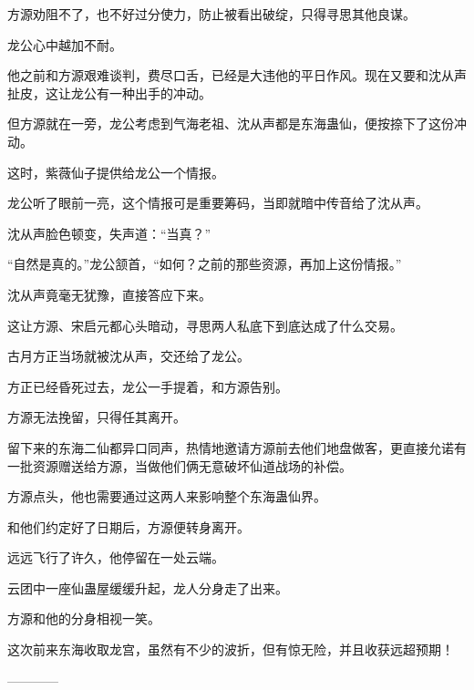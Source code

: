 \begin{this_body}
方源劝阻不了，也不好过分使力，防止被看出破绽，只得寻思其他良谋。

龙公心中越加不耐。

他之前和方源艰难谈判，费尽口舌，已经是大违他的平日作风。现在又要和沈从声扯皮，这让龙公有一种出手的冲动。

但方源就在一旁，龙公考虑到气海老祖、沈从声都是东海蛊仙，便按捺下了这份冲动。

这时，紫薇仙子提供给龙公一个情报。

龙公听了眼前一亮，这个情报可是重要筹码，当即就暗中传音给了沈从声。

沈从声脸色顿变，失声道：“当真？”

“自然是真的。”龙公颔首，“如何？之前的那些资源，再加上这份情报。”

沈从声竟毫无犹豫，直接答应下来。

这让方源、宋启元都心头暗动，寻思两人私底下到底达成了什么交易。

古月方正当场就被沈从声，交还给了龙公。

方正已经昏死过去，龙公一手提着，和方源告别。

方源无法挽留，只得任其离开。

留下来的东海二仙都异口同声，热情地邀请方源前去他们地盘做客，更直接允诺有一批资源赠送给方源，当做他们俩无意破坏仙道战场的补偿。

方源点头，他也需要通过这两人来影响整个东海蛊仙界。

和他们约定好了日期后，方源便转身离开。

远远飞行了许久，他停留在一处云端。

云团中一座仙蛊屋缓缓升起，龙人分身走了出来。

方源和他的分身相视一笑。

这次前来东海收取龙宫，虽然有不少的波折，但有惊无险，并且收获远超预期！

------------

\end{this_body}

